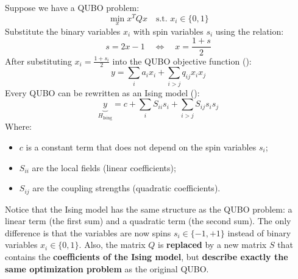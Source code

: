 \highspace
Suppose we have a QUBO problem:
\begin{equation*}
    \min_{x} x^T Q x \quad \text{s.t. } x_i \in \{0, 1\}
\end{equation*}
Substitute the binary variables $x_i$ with spin variables $s_i$ using the relation:
\begin{equation}\label{eq:binary-to-spin}
    s = 2x - 1 \quad \Longleftrightarrow \quad x = \frac{1 + s}{2}
\end{equation}
After substituting $x_i = \frac{1 + s_i}{2}$ into the QUBO objective function ():
\begin{equation*}
    y = \sum_{i} a_{i} x_{i} + \sum_{i > j} q_{ij} x_{i} x_{j}
\end{equation*}
Every QUBO can be rewritten as an Ising model ():
\begin{equation*}
    \underbrace{y}_{H_{\text{Ising}}} = c + \sum_i S_{ii} s_i + \sum_{i>j} S_{ij} s_i s_j
\end{equation*}
Where:
\begin{itemize}
    \item $c$ is a constant term that does not depend on the spin variables $s_i$;
    \item $S_{ii}$ are the local fields (linear coefficients);
    \item $S_{ij}$ are the coupling strengths (quadratic coefficients).
\end{itemize}
Notice that the Ising model has the same structure as the QUBO problem: a linear term (the first sum) and a quadratic term (the second sum). The only difference is that the variables are now spins $s_i \in \{-1, +1\}$ instead of binary variables $x_i \in \{0, 1\}$. Also, the matrix $Q$ is \textbf{replaced} by a new matrix $S$ that contains the \textbf{coefficients of the Ising model}, but \textbf{describe exactly the same optimization problem} as the original QUBO.

